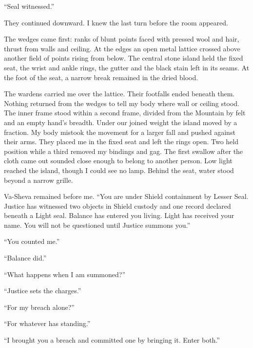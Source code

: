 ``Seal witnessed.''\par

They continued downward. I knew the last turn before the room appeared.\par

The wedges came first: ranks of blunt points faced with pressed wool and hair, thrust from walls and ceiling. At the edges an open metal lattice crossed above another field of points rising from below. The central stone island held the fixed seat, the wrist and ankle rings, the gutter and the black stain left in its seams. At the foot of the seat, a narrow break remained in the dried blood.\par

The wardens carried me over the lattice. Their footfalls ended beneath them. Nothing returned from the wedges to tell my body where wall or ceiling stood. The inner frame stood within a second frame, divided from the Mountain by felt and an empty hand's breadth. Under our joined weight the island moved by a fraction. My body mistook the movement for a larger fall and pushed against their arms. They placed me in the fixed seat and left the rings open. Two held position while a third removed my bindings and gag. The first swallow after the cloth came out sounded close enough to belong to another person. Low light reached the island, though I could see no lamp. Behind the seat, water stood beyond a narrow grille.\par

Va-Sheva remained before me. ``You are under Shield containment by Lesser Seal. Justice has witnessed two objects in Shield custody and one record declared beneath a Light seal. Balance has entered you living. Light has received your name. You will not be questioned until Justice summons you.''\par

``You counted me.''\par

``Balance did.''\par

``What happens when I am summoned?''\par

``Justice sets the charges.''\par

``For my breach alone?''\par

``For whatever has standing.''\par

``I brought you a breach and committed one by bringing it. Enter both.''\par

